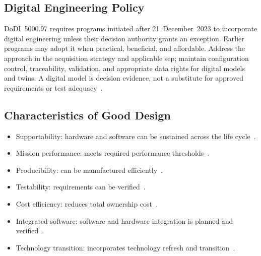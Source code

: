 \documentclass[../main.tex]{subfiles}
\begin{document}
\subsection{Digital Engineering Policy}
DoDI~5000.97 requires programs initiated after 21~December~2023 to incorporate digital engineering unless their decision authority grants an exception. Earlier programs may adopt it when practical, beneficial, and affordable. Address the approach in the acquisition strategy and applicable \ac{sep}; maintain configuration control, traceability, validation, and appropriate data rights for digital models and twins. A digital model is decision evidence, not a substitute for approved requirements or test adequacy~\autocite{DoDI5000-97}.

\subsection{Characteristics of Good Design}
\begin{itemize}
  \item Supportability: hardware and software can be sustained across the life cycle~\autocite{edo-3-5-1-systems-engineering-overview-2025}.
  \item Mission performance: meets required performance thresholds~\autocite{edo-3-5-1-systems-engineering-overview-2025}.
  \item Producibility: can be manufactured efficiently~\autocite{edo-3-5-1-systems-engineering-overview-2025}.
  \item Testability: requirements can be verified~\autocite{edo-3-5-1-systems-engineering-overview-2025}.
  \item Cost efficiency: reduces total ownership cost~\autocite{edo-3-5-1-systems-engineering-overview-2025}.
  \item Integrated software: software and hardware integration is planned and verified~\autocite{edo-3-5-1-systems-engineering-overview-2025}.
  \item Technology transition: incorporates technology refresh and transition~\autocite{edo-3-5-1-systems-engineering-overview-2025}.
\end{itemize}
\end{document}

